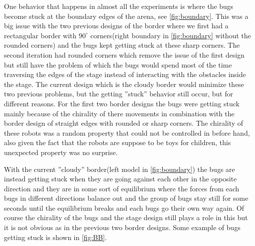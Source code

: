 One behavior that happens in almost all the experiments is where the bugs become stuck at the boundary edges of the 
arena, see \cref{fig:boundary}. This was a big issue with the two previous designs of the border where we first had a rectangular 
border with $90^\circ$ corners(right boundary in \cref{fig:boundary} without the rounded corners) and the bugs kept getting 
stuck at these sharp corners. The second iteration had 
rounded corners which remove the issue of the first design but still have the problem of which the bugs 
would spend most of the time traversing the edges of the stage instead of interacting with the obstacles 
inside the stage. The current design which is the cloudy border would minimize these two previous problems, 
but the getting ''stuck'' behavior still occur, but for different reasons. For the first two border designs 
the bugs were getting stuck mainly because of the chirality of there movements in combination with the border 
design of straight edges with rounded or sharp corners. The chirality of these robots was a random property that 
could not be controlled in before hand, also given the fact that the robots are suppose to be toys for children, 
this unexpected property was no surprise. 

With the current ''cloudy'' border(left model in \cref{fig:boundary}) the bugs are instead 
getting stuck when they are going against each other in the opposite direction and they are in some sort 
of equilibrium where the forces from each bugs in different directions balance out and the group of bugs stay still 
for some seconds until the equilibrium breaks and each bugs go their own way again. Of course the chirality of the 
bugs and the stage design still plays a role in this but it is not obvious as in the previous two border designs. 
Some example of bugs getting stuck is shown in \cref{fig:BB}.


